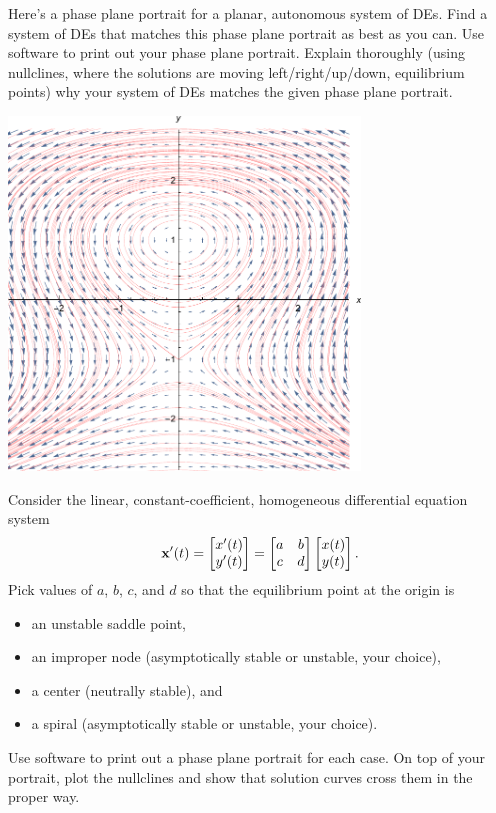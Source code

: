 \documentclass[boxes]{gsypset}
\begin{document}
	\begin{problem}
		Here's a phase plane portrait for a planar, autonomous system of DEs.
		Find a system of DEs that matches this phase plane portrait as best as you can. 
		Use software to print out your phase plane portrait. 
		Explain thoroughly (using nullclines, where the solutions are moving left/right/up/down, 
		equilibrium points) why your system of DEs matches the given phase plane portrait.
		\begin{center}
			\includegraphics[height=3.7in,keepaspectratio=true]{img/hw11-02}
		\end{center}
	\end{problem}
	\begin{solution}
		
	\end{solution}
	
	\begin{problem}
		Consider the linear, constant-coefficient, homogeneous differential equation system
		\[
			\mathbf{x}'(t) = \begin{bmatrix}x'(t) \\ y'(t)\end{bmatrix} = \begin{bmatrix}a & b \\ c & d\end{bmatrix}\begin{bmatrix}x(t) \\ y(t)\end{bmatrix}.
		\]
		Pick values of $a$, $b$, $c$, and $d$ so that the equilibrium point at the origin is 
		\begin{itemize}
			\item an unstable saddle point,
			\item an improper node (asymptotically stable or unstable, your choice),
			\item a center (neutrally stable), and
			\item a spiral (asymptotically stable or unstable, your choice).
		\end{itemize}
		Use software to print out a phase plane portrait for each case. 
		On top of your portrait, plot the nullclines and show that 
		solution curves cross them in the proper way.
	\end{problem}
	\begin{solution}
		
	\end{solution}
	
\end{document}
